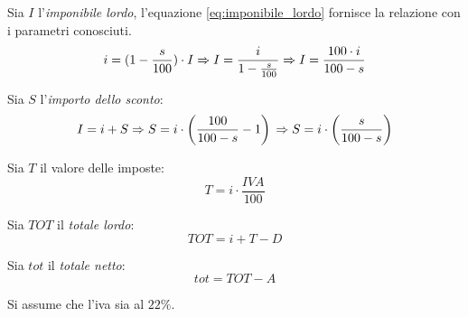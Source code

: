 \begin{description}
            Sia $I$ l'\emph{imponibile lordo}, l'equazione \ref{eq:imponibile_lordo} fornisce la relazione con i parametri conosciuti.
            \begin{equation}
              \label{eq:imponibile_lordo}
              i = (1 - \frac{s}{100})\cdot I \Rightarrow I = \frac{i}{1 - \frac{s}{100}} \\
              \Rightarrow I = \frac{100 \cdot i}{100 - s} 
            \end{equation}

            Sia $S$ l'\emph{importo dello sconto}:
            \begin{equation}
              \label{eq:importo_sconto}
              I = i + S \Rightarrow S = i\cdot \left( \frac{100}{100 - s} - 1 \right) \\
              \Rightarrow S = i \cdot \left( \frac{s}{100 - s} \right)
            \end{equation}

            Sia $T$ il valore delle imposte:
            \begin{equation}
              \label{eq:imposte}
              T = i \cdot \frac{IVA}{100}
            \end{equation}

            Sia $TOT$ il \emph{totale lordo}:
            \begin{equation}
              \label{eq:totale_lordo}
              TOT = i + T - D
            \end{equation}

            Sia $tot$ il \emph{totale netto}:
            \begin{equation}
              \label{eq:totale_netto}
              tot = TOT - A
            \end{equation}

            Si assume che l'iva sia al $22\%$.


\end{description}
